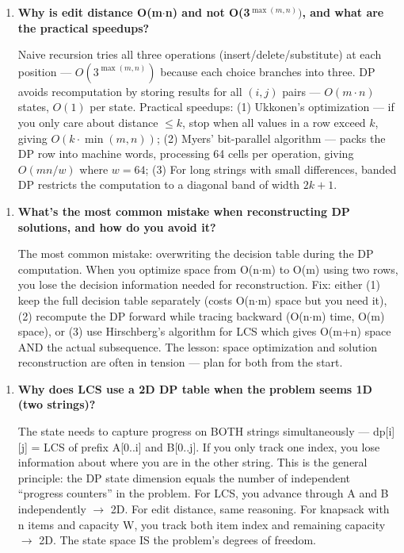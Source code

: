 \begin{enumerate}
\item \textbf{Why is edit distance O(m$\cdot$n) and not O(3$^{\max(m,n)})$, and what are the practical speedups?}\label{faq:edit-distance-speedup}

Naive recursion tries all three operations (insert/delete/substitute) at each position --- $O(3^{\max(m,n)})$ because each choice branches into three. DP avoids recomputation by storing results for all $(i,j)$ pairs --- $O(m \cdot n)$ states, $O(1)$ per state. Practical speedups: (1) Ukkonen's optimization --- if you only care about distance $\leq k$, stop when all values in a row exceed $k$, giving $O(k \cdot \min(m,n))$; (2) Myers' bit-parallel algorithm --- packs the DP row into machine words, processing 64 cells per operation, giving $O(mn/w)$ where $w = 64$; (3) For long strings with small differences, banded DP restricts the computation to a diagonal band of width $2k+1$.
\end{enumerate}

\begin{enumerate}
\item \textbf{What's the most common mistake when reconstructing DP solutions, and how do you avoid it?}\label{faq:dp-reconstruct-mistake}

The most common mistake: overwriting the decision table during the DP computation. When you optimize space from O(n$\cdot$m) to O(m) using two rows, you lose the decision information needed for reconstruction. Fix: either (1) keep the full decision table separately (costs O(n$\cdot$m) space but you need it), (2) recompute the DP forward while tracing backward (O(n$\cdot$m) time, O(m) space), or (3) use Hirschberg's algorithm for LCS which gives O(m+n) space AND the actual subsequence. The lesson: space optimization and solution reconstruction are often in tension — plan for both from the start.
\end{enumerate}

\begin{enumerate}
\item \textbf{Why does LCS use a 2D DP table when the problem seems 1D (two strings)?}\label{faq:lc-2d-state}

The state needs to capture progress on BOTH strings simultaneously — dp[i][j] = LCS of prefix A[0..i] and B[0..j]. If you only track one index, you lose information about where you are in the other string. This is the general principle: the DP state dimension equals the number of independent ``progress counters'' in the problem. For LCS, you advance through A and B independently $\to$ 2D. For edit distance, same reasoning. For knapsack with n items and capacity W, you track both item index and remaining capacity $\to$ 2D. The state space IS the problem's degrees of freedom.
\end{enumerate}

